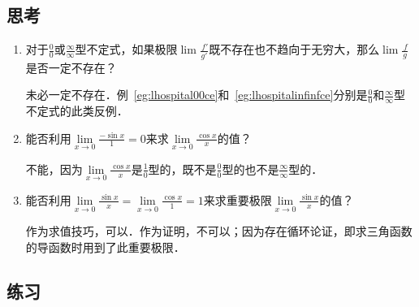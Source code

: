 \subsection*{思考}

\begin{enumerate}
\item 对于\(\frac00\)或\(\frac\infty\infty\)型不定式，如果极限\(\lim\frac{\,f'}{g'}\)既不存在也不趋向于无穷大，那么\(\lim\frac{\,f}{g}\)是否一定不存在？

  \ifshowsolp
    未必一定不存在．例~\ref{eg:lhospital00ce}和~\ref{eg:lhospitalinfinfce}分别是\(\frac00\)和\(\frac\infty\infty\)型不定式的此类反例．
  \fi

\item 能否利用\(\lim\limits_{x\to0} \frac{-\sin x}{1} = 0\)来求\(\lim\limits_{x\to0} \frac{\cos x}{x}\)的值？

  \ifshowsolp
    不能，因为\(\lim\limits_{x\to0} \frac{\cos x}{x}\)是\(\frac10\)型的，既不是\(\frac00\)型的也不是\(\frac\infty\infty\)型的．
  \fi

\item 能否利用\(\lim\limits_{x\to0} \frac{\sin x}{x} = \lim\limits_{x\to0} \frac{\cos x}{1} = 1\)来求重要极限\(\lim\limits_{x\to0} \frac{\sin x}{x}\)的值？

  \ifshowsolp
    作为求值技巧，可以．作为证明，不可以；因为存在循环论证，即求三角函数的导函数时用到了此重要极限．
  \fi
\end{enumerate}

\ifshowex
{}
\subsection*{练习}

